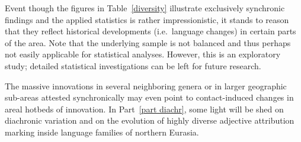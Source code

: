 Event though the figures in Table~\ref{diversity} illustrate exclusively synchronic findings and the applied statistics is rather impressionistic, it stands to reason that they reflect historical developments (i.e.~language changes) in certain parts of the area. Note that the underlying sample is not balanced and thus perhaps not easily applicable for statistical analyses. However, this is an exploratory study; detailed statistical investigations can be left for future research.

The massive innovations in several neighboring genera or in larger geographic sub-areas attested synchronically may even point to contact-induced changes in areal hotbeds of innovation. In Part~\ref{part diachr}, some light will be shed on diachronic variation and on the evolution of highly diverse adjective attribution marking inside language families of northern Eurasia.
